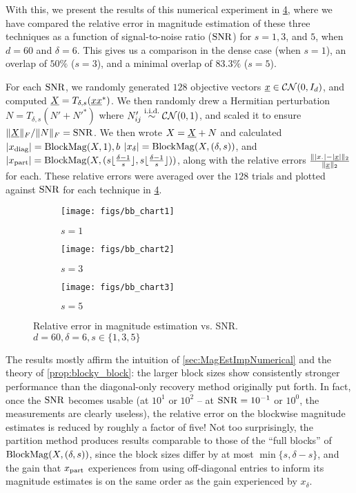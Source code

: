 With this, we present the results of this numerical experiment in \cref{fig:bb_charts}, where we have compared the relative error in magnitude estimation of these three techniques as a function of signal-to-noise ratio ($\operatorname{SNR}$) for $s = 1, 3$, and $5$, when $d = 60$ and $\delta = 6$.  This gives us a comparison in the dense case (when $s = 1$), an overlap of $50\%$ ($s = 3$), and a minimal overlap of $83.3\%$ ($s = 5$).

For each $\operatorname{SNR}$, we randomly generated $128$ objective vectors $\underline{x} \in \mathcal{C N}(0, I_d)$, and computed $\underline{X} = T_{\delta, s}(\underline{x} \underline{x}^*)$.  We then randomly drew a Hermitian perturbation $N = T_{\delta, s}(N' + N'^*)$ where $N'_{ij} \overset{\text{i.i.d.}}{\sim} \mathcal{C N}(0, 1)$, and scaled it to ensure $\lVert\underline{X}\rVert_F / \lVert N\rVert_F = \operatorname{SNR}$.  We then wrote $X = \underline{X} + N$ and calculated $\lvert x_{\operatorname{diag}}\rvert = \operatorname{BlockMag}(X, 1),b$ $\lvert x_{\delta}\rvert = \operatorname{BlockMag}(X, (\delta, s))$, and $\lvert x_{\rm part}\rvert = \operatorname{BlockMag}(X, (s\lfloor\frac{\delta - 1}{s}\rfloor, s\lfloor\frac{\delta - 1}{s}\rfloor))$, along with the relative errors $\frac{\lVert\lvert x_{\cdot}\rvert - \lvert\underline{x}\rvert\rVert_2}{\lVert\underline{x}\rVert_2}$ for each.
These relative errors were averaged over the $128$ trials and plotted against $\operatorname{SNR}$ for each technique in \cref{fig:bb_charts}.

\begin{figure}
  \centering
  \begin{subfigure}[b]{.49\textwidth}
    \centering
    \texttt{[image: figs/bb\_chart1]}
    \caption{$s = 1$}
    \label{fig:bb_chart1}
  \end{subfigure}
  \begin{subfigure}[b]{.49\textwidth}
    \centering
    \texttt{[image: figs/bb\_chart2]}
    \caption{$s = 3$}
    \label{fig:bb_chart2}
  \end{subfigure}
  \begin{subfigure}[b]{.49\textwidth}
    \centering
    \texttt{[image: figs/bb\_chart3]}
    \caption{$s=5$}
    \label{fig:bb_chart3}
  \end{subfigure}
  \caption{Relative error in magnitude estimation vs. SNR.  $d = 60, \delta = 6, s \in \{1, 3, 5\}$}
  \label{fig:bb_charts}
\end{figure}

The results mostly affirm the intuition of \cref{sec:MagEstImpNumerical} and the theory of \cref{prop:blocky_block}: the larger block sizes show consistently stronger performance than the diagonal-only recovery method originally put forth.  In fact, once the $\operatorname{SNR}$ becomes usable (at $10^1$ or $10^2$ -- at $\operatorname{SNR} = 10^{-1}$ or $10^0$, the measurements are clearly useless), the relative error on the blockwise magnitude estimates is reduced by roughly a factor of five!  Not too surprisingly, the partition method produces results comparable to those of the ``full blocks'' of $\operatorname{BlockMag}(X, (\delta, s))$, since the block sizes differ by at most $\min\{s, \delta - s\}$, and the gain that $x_{\rm part}$ experiences from using off-diagonal entries to inform its magnitude estimates is on the same order as the gain experienced by $x_\delta$.

